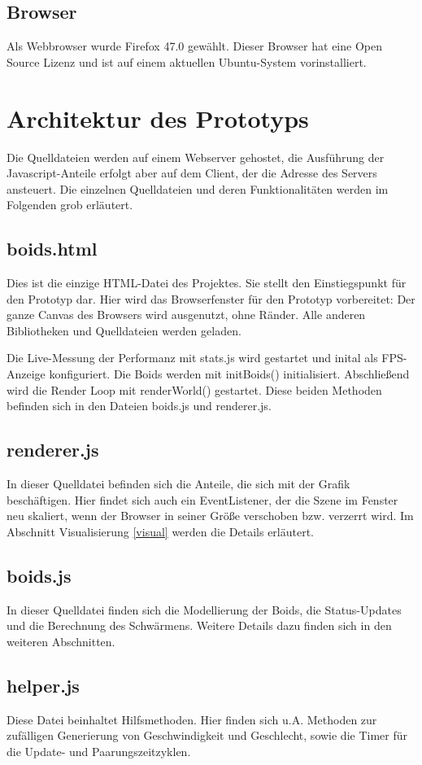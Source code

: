 \documentclass[draft=false
              ,paper=a4
              ,twoside=false
              ,fontsize=11pt
              ,headsepline
              ,BCOR10mm
              ,DIV11
              ,bibtotoc
              ,liststotoc
              ]{scrbook}
\begin{document}
\subsection{Browser}
Als Webbrowser wurde Firefox 47.0 gewählt. Dieser Browser hat eine Open Source Lizenz und ist auf einem aktuellen Ubuntu-System vorinstalliert.
\section{Architektur des Prototyps}
Die Quelldateien werden auf einem Webserver gehostet, die Ausführung der Javascript-Anteile erfolgt aber auf dem Client, der die Adresse des Servers ansteuert.
Die einzelnen Quelldateien und deren Funktionalitäten werden im Folgenden grob erläutert.
\subsection{boids.html}
Dies ist die einzige HTML-Datei des Projektes. Sie stellt den Einstiegspunkt für den Prototyp dar. Hier wird das Browserfenster für den Prototyp vorbereitet: Der ganze Canvas des Browsers wird ausgenutzt, ohne Ränder. Alle anderen Bibliotheken und Quelldateien werden geladen.

Die Live-Messung der Performanz mit stats.js wird gestartet und inital als FPS-Anzeige konfiguriert.
Die Boids werden mit initBoids() initialisiert. Abschließend wird die Render Loop mit renderWorld() gestartet. Diese beiden Methoden befinden sich in den Dateien boids.js und renderer.js.
\subsection{renderer.js}
In dieser Quelldatei befinden sich die Anteile, die sich mit der Grafik beschäftigen. Hier findet sich auch ein EventListener, der die Szene im Fenster neu skaliert, wenn der Browser in seiner Größe verschoben bzw. verzerrt wird. Im Abschnitt Visualisierung \ref{visual} werden die Details erläutert.
\subsection{boids.js}
In dieser Quelldatei finden sich die Modellierung der Boids, die Status-Updates und die Berechnung des Schwärmens. Weitere Details dazu finden sich in den weiteren Abschnitten.
\subsection{helper.js}
Diese Datei beinhaltet Hilfsmethoden. Hier finden sich u.A. Methoden zur zufälligen Generierung von Geschwindigkeit und Geschlecht, sowie die Timer für die Update- und Paarungszeitzyklen.
\end{document}
